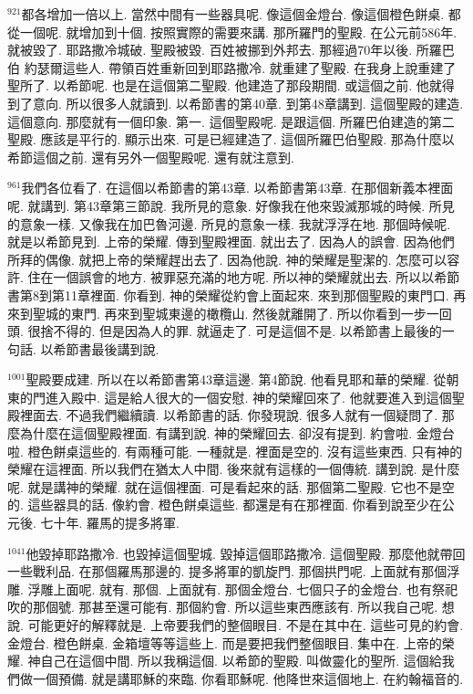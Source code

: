\documentclass{book}
\begin{document}
$^{921}$都各增加一倍以上.
當然中間有一些器具呢.
像這個金燈台.
像這個橙色餅桌.
都從一個呢.
就增加到十個.
按照實際的需要來講.
那所羅門的聖殿.
在公元前586年.
就被毀了.
耶路撒冷城破.
聖殿被毀.
百姓被挪到外邦去.
那經過70年以後.
所羅巴伯 約瑟爾這些人.
帶領百姓重新回到耶路撒冷.
就重建了聖殿.
在我身上說重建了聖所了.
以希節呢.
也是在這個第二聖殿.
他建造了那段期間.
或這個之前.
他就得到了意向.
所以很多人就讀到.
以希節書的第40章.
到第48章講到.
這個聖殿的建造.
這個意向.
那麼就有一個印象.
第一.
這個聖殿呢.
是跟這個.
所羅巴伯建造的第二聖殿.
應該是平行的.
顯示出來.
可是已經建造了.
這個所羅巴伯聖殿.
那為什麼以希節這個之前.
還有另外一個聖殿呢.
還有就注意到.

$^{961}$我們各位看了.
在這個以希節書的第43章.
以希節書第43章.
在那個新義本裡面呢.
就講到.
第43章第三節說.
我所見的意象.
好像我在他來毀滅那城的時候.
所見的意象一樣.
又像我在加巴魯河邊.
所見的意象一樣.
我就浮浮在地.
那個時候呢.
就是以希節見到.
上帝的榮耀.
傳到聖殿裡面.
就出去了.
因為人的誤會.
因為他們所拜的偶像.
就把上帝的榮耀趕出去了.
因為他說.
神的榮耀是聖潔的.
怎麼可以容許.
住在一個誤會的地方.
被罪惡充滿的地方呢.
所以神的榮耀就出去.
所以以希節書第8到第11章裡面.
你看到.
神的榮耀從約會上面起來.
來到那個聖殿的東門口.
再來到聖城的東門.
再來到聖城東邊的橄欖山.
然後就離開了.
所以你看到一步一回頭.
很捨不得的.
但是因為人的罪.
就逼走了.
可是這個不是.
以希節書上最後的一句話.
以希節書最後講到說.

$^{1001}$聖殿要成建.
所以在以希節書第43章這邊.
第4節說.
他看見耶和華的榮耀.
從朝東的門進入殿中.
這是給人很大的一個安慰.
神的榮耀回來了.
他就要進入到這個聖殿裡面去.
不過我們繼續讀.
以希節書的話.
你發現說.
很多人就有一個疑問了.
那麼為什麼在這個聖殿裡面.
有講到說.
神的榮耀回去.
卻沒有提到.
約會啦.
金燈台啦.
橙色餅桌這些的.
有兩種可能.
一種就是.
裡面是空的.
沒有這些東西.
只有神的榮耀在這裡面.
所以我們在猶太人中間.
後來就有這樣的一個傳統.
講到說.
是什麼呢.
就是講神的榮耀.
就在這個裡面.
可是看起來的話.
那個第二聖殿.
它也不是空的.
這些器具的話.
像約會.
橙色餅桌這些.
都還是有在那裡面.
你看到說至少在公元後.
七十年.
羅馬的提多將軍.

$^{1041}$他毀掉耶路撒冷.
也毀掉這個聖城.
毀掉這個耶路撒冷.
這個聖殿.
那麼他就帶回一些戰利品.
在那個羅馬那邊的.
提多將軍的凱旋門.
那個拱門呢.
上面就有那個浮雕.
浮雕上面呢.
就有.
那個.
上面就有.
那個金燈台.
七個只子的金燈台.
也有祭祀吹的那個號.
那甚至還可能有.
那個約會.
所以這些東西應該有.
所以我自己呢.
想說.
可能更好的解釋就是.
上帝要我們的整個眼目.
不是在其中在.
這些可見的約會.
金燈台.
橙色餅桌.
金箱壇等等這些上.
而是要把我們整個眼目.
集中在.
上帝的榮耀.
神自己在這個中間.
所以我稱這個.
以希節的聖殿.
叫做靈化的聖所.
這個給我們做一個預備.
就是講耶穌的來臨.
你看耶穌呢.
他降世來這個地上.
在約翰福音的.
\end{document}

